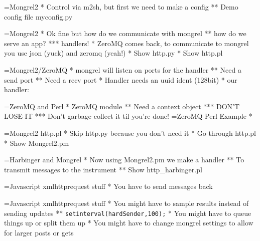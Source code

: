 \documentclass[titlepage,usenames,a4,landscape,semhelv]{seminar}
\begin{document}
\begin{slide}
=Mongrel2 
* Control via m2sh, but first we need to make a config
** Demo config file myconfig.py

=Mongrel2
* Ok fine but how do we communicate with mongrel
** how do we serve an app?
*** handlers!
* ZeroMQ comes back, to communicate to mongrel you use json (yuck) and
zeromq (yeah!)
* Show http.py 
* Show http.pl 

=Mongrel2/ZeroMQ
* mongrel will listen on ports for the handler
** Need a send port 
** Need a recv port
* Handler needs an uuid ident (128bit)
* our handler:

=ZeroMQ and Perl
* ZeroMQ module
** Need a context object 
*** DON'T LOSE IT
*** Don't garbage collect it til you're done!
=ZeroMQ Perl Example
* 

=Mongrel2 http.pl
* Skip http.py because you don't need it
* Go through http.pl
* Show Mongrel2.pm

=Harbinger and Mongrel
* Now using Mongrel2.pm we make a handler
** To transmit messages to the instrument
** Show http\_harbinger.pl

=Javascript xmlhttprequest stuff
* You have to send messages back

=Javascript xmlhttprequest stuff
* You might have to sample results instead of sending updates
** \texttt{setinterval(hardSender,100);}
* You might have to queue things up or split them up
* You might have to change mongrel settings to allow for 
  larger posts or gets


\end{slide}
\end{document}
